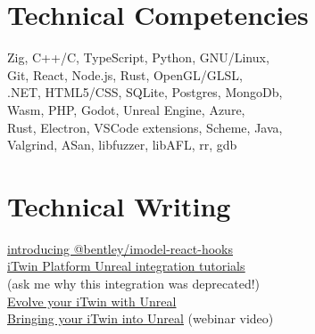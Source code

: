 \documentclass[Letterpaper,11pt]{article}
\newcommand\link[2]{\href{#1}{\underline{#2}}}
\begin{document}
\begin{multicols}{2}

    \section*{Technical Competencies}
        Zig, C++/C, TypeScript, Python, GNU/Linux,
        \\
        Git, React, Node.js, Rust, OpenGL/GLSL,
        \\
        .NET, HTML5/CSS, SQLite, Postgres, MongoDb,
        \\ 
        Wasm, PHP, Godot, Unreal Engine, Azure,
        \\
        Rust, Electron, VSCode extensions, Scheme, Java,
        \\
        Valgrind, ASan, libfuzzer, libAFL, rr, gdb

    \section*{Technical Writing}
        \link{https://medium.com/itwinjs/introducing-bentley-imodel-react-hooks-8945a72711d2}{introducing @bentley/imodel-react-hooks}
        \\
        \link{https://web.archive.org/web/20220926063257/https://developer.bentley.com/tutorials/itwin-unreal-controlling-your-imodel/}{iTwin Platform Unreal integration tutorials}
        \\
        (ask me why this integration was deprecated!)
        \\
        \link{https://medium.com/itwinjs/evolve-your-itwin-with-unreal-45206afe19f4}{Evolve your iTwin with Unreal}
        \\
    \link{https://www.youtube.com/watch?v=IV0eBECws1k&t=130s}{Bringing your iTwin into Unreal} (webinar video)

\end{multicols}

\clearpage
\end{document}
